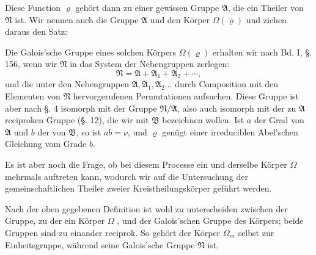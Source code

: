 Diese Function $\varrho$ gehört dann zu einer gewissen Gruppe $\mathfrak{A}$,
die ein Theiler von $\mathfrak{N}$ ist. Wir nennen auch die Gruppe $\mathfrak{A}$ und
den Körper $\Omega(\varrho)$  und ziehen daraus den
Satz:


Die Galois'sche Gruppe eines solchen Körpers $\Omega(\varrho)$ erhalten wir nach Bd. I, §. 156, wenn wir $\mathfrak{N}$ in das System der
Nebengruppen zerlegen:
\[
\mathfrak{N} = \mathfrak{A} + \mathfrak{A}_1 + \mathfrak{A}_2 + \cdots,
\]
und die unter den Nebengruppen $\mathfrak{A}, \mathfrak{A}_1, \mathfrak{A}_2 \ldots$ durch Composition
mit den Elementen von $\mathfrak{N}$ hervorgerufenen Permutationen aufsuchen. Diese Gruppe ist aber nach §. 4 isomorph mit der
Gruppe $\mathfrak{N}/\mathfrak{A}$, also auch isomorph mit der zu $\mathfrak{A}$ reciproken Gruppe
(§. 12), die wir mit $\mathfrak{B}$ bezeichnen wollen. Ist $a$ der Grad von $\mathfrak{A}$
und $b$ der von $\mathfrak{B}$, so ist $ab = \nu$, und $\varrho$ genügt einer irreduciblen
Abel'schen Gleichung vom Grade $b$.


Es ist aber noch die Frage, ob bei diesem Processe ein und
derselbe Körper $\Omega$ mehrmals auftreten kann, wodurch wir auf
die Untersuchung der gemeinschaftlichen Theiler zweier Kreistheilungskörper geführt werden.

Nach der oben gegebenen Definition ist wohl zu unterscheiden zwischen der Gruppe, zu der ein Körper $\Omega$ ,
und der Galois'schen Gruppe des Körpers; beide Gruppen sind
zu einander reciprok. So gehört der Körper $\Omega_m$ selbst zur
Einheitsgruppe, während seine Galois'sche Gruppe $\mathfrak{N}$ ist,
